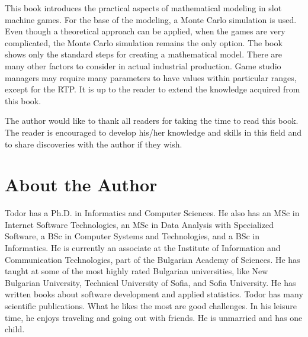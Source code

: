 \documentclass[12pt,twoside,openany]{book}
\begin{document}
This book introduces the practical aspects of mathematical modeling in slot machine games. For the base of the modeling, a Monte Carlo simulation is used. Even though a theoretical approach can be applied, when the games are very complicated, the Monte Carlo simulation remains the only option. The book shows only the standard steps for creating a mathematical model. There are many other factors to consider in actual industrial production. Game studio managers may require many parameters to have values within particular ranges, except for the RTP. It is up to the reader to extend the knowledge acquired from this book.

The author would like to thank all readers for taking the time to read this book. The reader is encouraged to develop his/her knowledge and skills in this field and to share discoveries with the author if they wish.

\backmatter

\pagestyle{empty}
\chapter*{About the Author}
\thispagestyle{empty}
Todor has a Ph.D. in Informatics and Computer Sciences. He also has an MSc in Internet Software Technologies, an MSc in Data Analysis with Specialized Software, a BSc in Computer Systems and Technologies, and a BSc in Informatics. He is currently an associate at the Institute of Information and Communication Technologies, part of the Bulgarian Academy of Sciences. He has taught at some of the most highly rated Bulgarian universities, like New Bulgarian University, Technical University of Sofia, and Sofia University. He has written books about software development and applied statistics. Todor has many scientific publications. What he likes the most are good challenges. In his leisure time, he enjoys traveling and going out with friends. He is unmarried and has one child.
\end{document}

